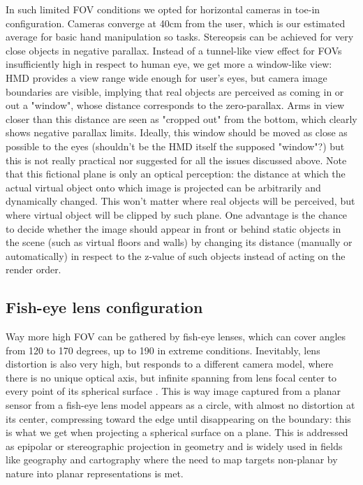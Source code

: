 In such limited FOV conditions we opted for horizontal cameras in toe-in configuration. Cameras converge at 40cm from the user, which is our estimated average for basic hand manipulation so tasks. Stereopsis can be achieved for very close objects in negative parallax. Instead of a tunnel-like view effect for FOVs insufficiently high in respect to human eye, we get more a window-like view: HMD provides a view range wide enough for user's eyes, but camera image boundaries are visible, implying that real objects are perceived as coming in or out a "window", whose distance corresponds to the zero-parallax. Arms in view closer than this distance are seen as "cropped out" from the bottom, which clearly shows negative parallax limits. Ideally, this window should be moved as close as possible to the eyes (shouldn't be the HMD itself the supposed "window"?) but this is not really practical nor suggested for all the issues discussed above. Note that this fictional plane is only an optical perception: the distance at which the actual virtual object onto which image is projected can be arbitrarily and dynamically changed. This won't matter where real objects will be perceived, but where virtual object will be clipped by such plane. One advantage is the chance to decide whether the image should appear in front or behind static objects in the scene (such as virtual floors and walls) by changing its distance (manually or automatically) in respect to the z-value of such objects instead of acting on the render order.

\subsection{Fish-eye lens configuration}
Way more high FOV can be gathered by fish-eye lenses, which can cover angles from 120 to 170 degrees, up to 190 in extreme conditions. Inevitably, lens distortion is also very high, but responds to a different camera model, where there is no unique optical axis, but infinite spanning from lens focal center to every point of its spherical surface \cite{fisheye_lens}. This is way image captured from a planar sensor from a fish-eye lens model appears as a circle, with almost no distortion at its center, compressing toward the edge until disappearing on the boundary: this is what we get when projecting a spherical surface on a plane. This is addressed as epipolar or stereographic projection in geometry and is widely used in fields like geography and cartography \cite{book_stereographic_projection} where the need to map targets non-planar by nature into planar representations is met.

